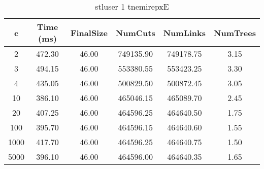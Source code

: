 \begin{table}[ht]
\centering
\caption{stluser 1 tnemirepxE}
\begin{tabular}{|c|c|c|c|c|c|}
\hline
c & Time (ms) & FinalSize & NumCuts & NumLinks & NumTrees \\
\hline
2    & 472.30  & 46.00  & 749135.90 & 749178.75 & 3.15 \\ 
3    & 494.15  & 46.00  & 553380.55 & 553423.25 & 3.30 \\ 
4    & 435.05  & 46.00  & 500829.50 & 500872.45 & 3.05 \\ 
10   & 386.10  & 46.00  & 465046.15 & 465089.70 & 2.45 \\ 
20   & 407.25  & 46.00  & 464596.25 & 464640.50 & 1.75 \\ 
100  & 395.70  & 46.00  & 464596.15 & 464640.60 & 1.55 \\ 
1000 & 417.70  & 46.00  & 464596.25 & 464640.75 & 1.50 \\ 
5000 & 396.10  & 46.00  & 464596.00 & 464640.35 & 1.65 \\ 
\hline
\end{tabular}
\end{table}